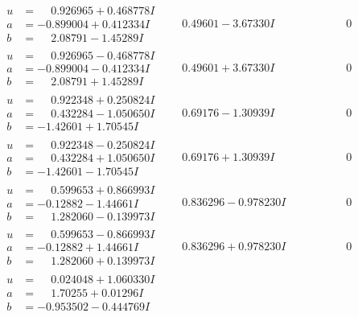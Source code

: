 \documentclass[1p]{elsarticle_modified}
\theoremstyle{definition}
\begin{document}
$$\begin{array}{c|c|c}
\begin{aligned}
u &= \phantom{-}0.926965 + 0.468778 I \\
a &= -0.899004 + 0.412334 I \\
b &= \phantom{-}2.08791 - 1.45289 I\end{aligned}
 & \phantom{-}0.49601 - 3.67330 I & \phantom{-0.000000 } 0 \\ \hline\begin{aligned}
u &= \phantom{-}0.926965 - 0.468778 I \\
a &= -0.899004 - 0.412334 I \\
b &= \phantom{-}2.08791 + 1.45289 I\end{aligned}
 & \phantom{-}0.49601 + 3.67330 I & \phantom{-0.000000 } 0 \\ \hline\begin{aligned}
u &= \phantom{-}0.922348 + 0.250824 I \\
a &= \phantom{-}0.432284 - 1.050650 I \\
b &= -1.42601 + 1.70545 I\end{aligned}
 & \phantom{-}0.69176 - 1.30939 I & \phantom{-0.000000 } 0 \\ \hline\begin{aligned}
u &= \phantom{-}0.922348 - 0.250824 I \\
a &= \phantom{-}0.432284 + 1.050650 I \\
b &= -1.42601 - 1.70545 I\end{aligned}
 & \phantom{-}0.69176 + 1.30939 I & \phantom{-0.000000 } 0 \\ \hline\begin{aligned}
u &= \phantom{-}0.599653 + 0.866993 I \\
a &= -0.12882 - 1.44661 I \\
b &= \phantom{-}1.282060 - 0.139973 I\end{aligned}
 & \phantom{-}0.836296 - 0.978230 I & \phantom{-0.000000 } 0 \\ \hline\begin{aligned}
u &= \phantom{-}0.599653 - 0.866993 I \\
a &= -0.12882 + 1.44661 I \\
b &= \phantom{-}1.282060 + 0.139973 I\end{aligned}
 & \phantom{-}0.836296 + 0.978230 I & \phantom{-0.000000 } 0 \\ \hline\begin{aligned}
u &= \phantom{-}0.024048 + 1.060330 I \\
a &= \phantom{-}1.70255 + 0.01296 I \\
b &= -0.953502 - 0.444769 I\end{aligned}

\end{array}$$
\end{document}
